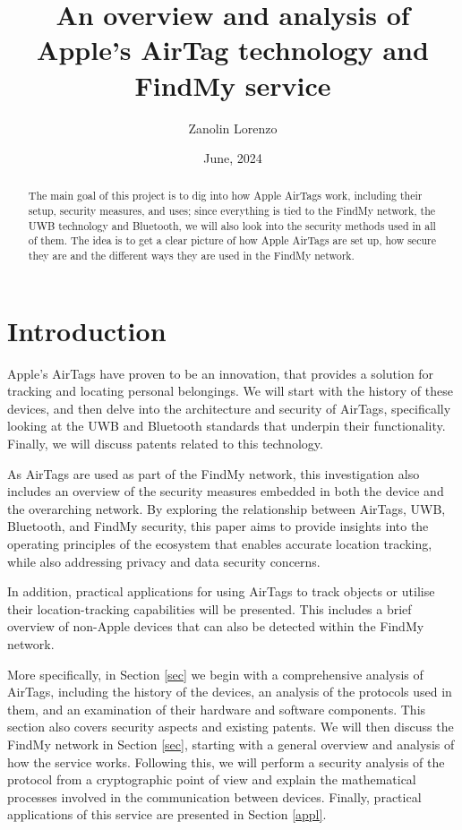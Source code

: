\documentclass[english]{article}
\title{An overview and analysis of Apple’s AirTag technology and FindMy service}
\author{Zanolin Lorenzo}
\date{June, 2024}
\begin{document}
\maketitle

\tableofcontents
\newpage


\begin{abstract}
  The main goal of this project is to dig into how Apple AirTags work, including their setup, security measures, and uses; since everything is tied to the FindMy network, the UWB technology and Bluetooth, we will also look into the security methods used in all of them. The idea is to get a clear picture of how Apple AirTags are set up, how secure they are and the different ways they are used in the FindMy network.
\end{abstract}

\section{Introduction}\label{sec:intro}

Apple's AirTags have proven to be an innovation, that provides a solution for tracking and locating personal belongings. We will start with the history of these devices, and then delve into the architecture and security of AirTags, specifically looking at the UWB and Bluetooth standards that underpin their functionality. Finally, we will discuss patents related to this technology.

As AirTags are used as part of the FindMy network, this investigation also includes an overview of the security measures embedded in both the device and the overarching network. By exploring the relationship between AirTags, UWB, Bluetooth, and FindMy security, this paper aims to provide insights into the operating principles of the ecosystem that enables accurate location tracking, while also addressing privacy and data security concerns.

In addition, practical applications for using AirTags to track objects or utilise their location-tracking capabilities will be presented. This includes a brief overview of non-Apple devices that can also be detected within the FindMy network.

More specifically, in Section \ref{sec} we begin with a comprehensive analysis of AirTags, including the history of the devices, an analysis of the protocols used in them, and an examination of their hardware and software components. This section also covers security aspects and existing patents. We will then discuss the FindMy network in Section \ref{sec}, starting with a general overview and analysis of how the service works. Following this, we will perform a security analysis of the protocol from a cryptographic point of view and explain the mathematical processes involved in the communication between devices. Finally, practical applications of this service are presented in Section \ref{appl}.
\end{document}

